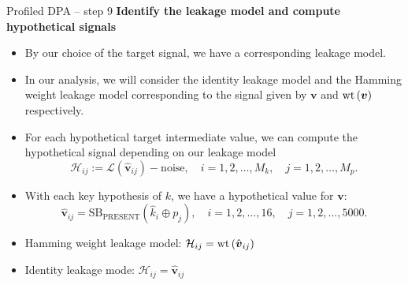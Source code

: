 \begin{frame}{Profiled DPA -- step 9}
    \textbf{Identify the leakage model and compute hypothetical signals}
    \begin{itemize}
        \item By our choice of the target signal, we have a corresponding leakage model.
        \item In our analysis, we will consider the identity leakage model and the Hamming weight leakage model corresponding to the signal given by $\boldsymbol{v}$ and $\textrm{wt}\left(\boldsymbol{v}\right)$ respectively.
        \item For each hypothetical target intermediate value, we can compute the hypothetical signal depending on our leakage model
    \[
    \mathcal{H}_{ij}:=\mathcal{L}(\hat{\boldsymbol{v}}_{ij})-\text{noise},\quad i=1,2,\dots,M_k,\quad j=1,2,\dots,M_p.
    \]
    \end{itemize}
    \begin{example}
        \begin{itemize}
            \item With each key hypothesis of $k$, we have a hypothetical value for $\boldsymbol{v}$:
        \[
    \hat{\boldsymbol{v}}_{ij}=\text{SB}_{\text{PRESENT}}(\hat{k}_i\oplus p_j),\quad i=1,2,\dots,16,\quad j=1,2,\dots,5000.
    \]
    \item Hamming weight leakage model: $\mathcal{H}_{ij}=\textrm{wt}\left(\hat{\boldsymbol{v}}_{ij}\right)$
        \item Identity leakage mode: $\mathcal{H}_{ij}=\hat{\boldsymbol{v}}_{ij}$
        \end{itemize}
    \end{example}
\end{frame}

